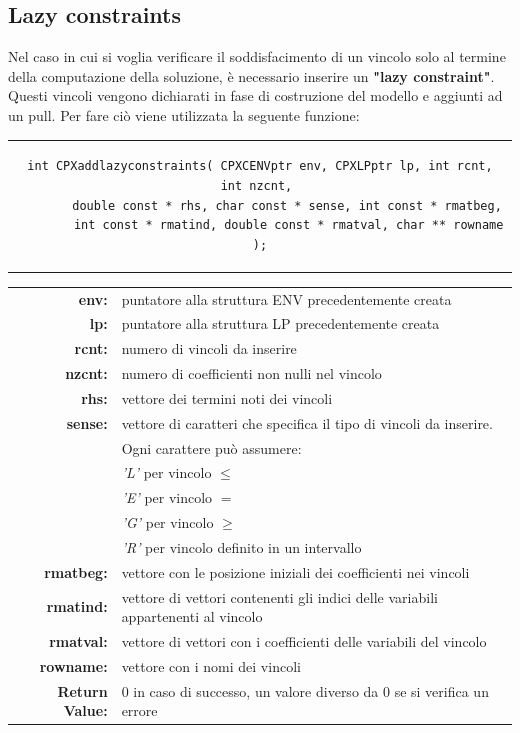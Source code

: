 \subsection{Lazy constraints}
Nel caso in cui si voglia verificare il soddisfacimento di un vincolo solo al termine della computazione della soluzione, è necessario inserire un \textbf{"lazy constraint"}. Questi vincoli vengono 
dichiarati in fase di costruzione del modello e aggiunti ad un pull. Per fare ciò viene utilizzata la seguente funzione:
\begin{center}
\begin{tabular}{c}
\begin{lstlisting}[linewidth=390pt, basicstyle=\footnotesize\sffamily,]  
int CPXaddlazyconstraints( CPXCENVptr env, CPXLPptr lp, int rcnt, int nzcnt, 
		double const * rhs, char const * sense, int const * rmatbeg, 
		int const * rmatind, double const * rmatval, char ** rowname );
\end{lstlisting}
\end{tabular}
\end{center}
\begin{table}[h]
\centering
\begin{tabular}{rl}
\textbf{env:} & {puntatore alla struttura ENV precedentemente creata}\\
\textbf{lp:} & {puntatore alla struttura LP precedentemente creata}\\
\textbf{rcnt:} & {numero di vincoli da inserire}\\
\textbf{nzcnt:} & {numero di coefficienti non nulli nel vincolo}\\ 
\textbf{rhs:} & {vettore dei termini noti dei vincoli}\\
\textbf{sense:} & {vettore di caratteri che specifica il tipo di vincoli da inserire.}\\
&{Ogni carattere può assumere:}\\
&{\textit{'L'} per vincolo $\leq$}\\
&{\textit{'E'} per vincolo $=$}\\
&{\textit{'G'} per vincolo $\geq$}\\
&{\textit{'R'} per vincolo definito in un intervallo}\\
\textbf{rmatbeg:} & {vettore con le posizione iniziali dei coefficienti nei vincoli}\\
\textbf{rmatind:} & {vettore di vettori contenenti gli indici delle variabili appartenenti al vincolo}\\
\textbf{rmatval:} & {vettore di vettori con i coefficienti delle variabili del vincolo}\\
\textbf{rowname:} & {vettore con i nomi dei vincoli}\\
\textbf{Return Value:} & {0 in caso di successo, un valore diverso da 0 se si verifica un errore}\\
\end{tabular}
\end{table}
